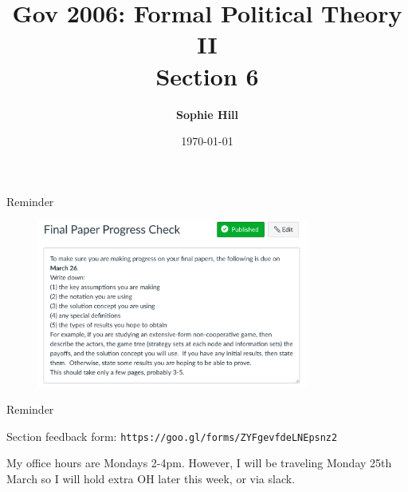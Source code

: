 \documentclass[11pt,aspectratio=169]{beamer}
\title{Gov 2006: Formal Political Theory II \\
Section 6}
\date{\today}
\author{ \textbf{Sophie Hill}}
\begin{document}
  \maketitle
  
\begin{frame}{Reminder}

\begin{figure}
\includegraphics[width=0.8\textwidth]{canvas.png}
\end{figure}

\end{frame}

\begin{frame}{Reminder}

Section feedback form: \texttt{https://goo.gl/forms/ZYFgevfdeLNEpsnz2}

\vspace{2em}

My office hours are Mondays 2-4pm. However, I will be traveling Monday 25th March so I will hold extra OH later this week, or via slack.
\end{frame}
\end{document}

